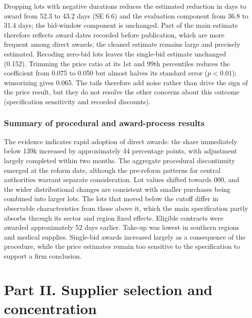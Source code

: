 \documentclass[11pt,a4paper]{article}
\begin{document}
Dropping lots with negative durations reduces the estimated reduction in days to award from 52.3 to 43.2 days (SE 6.6) and the evaluation component from 36.8 to 31.4 days; the bid-window component is unchanged. Part of the main estimate therefore reflects award dates recorded before publication, which are more frequent among direct awards; the cleaned estimate remains large and precisely estimated. Recoding zero-bid lots leaves the single-bid estimate unchanged (0.152). Trimming the price ratio at its 1st and 99th percentiles reduces the coefficient from 0.075 to 0.050 but almost halves its standard error ($p<0.01$); winsorizing gives 0.065. The tails therefore add noise rather than drive the sign of the price result, but they do not resolve the other concerns about this outcome (specification sensitivity and recorded discounts).

\section{Summary of procedural and award-process results}

The evidence indicates rapid adoption of direct awards: the share immediately below \texteuro139k increased by approximately 44 percentage points, with adjustment largely completed within two months. The aggregate procedural discontinuity emerged at the reform date, although the pre-reform patterns for central authorities warrant separate consideration. Lot values shifted towards 000, and the wider distributional changes are consistent with smaller purchases being combined into larger lots. The lots that moved below the cutoff differ in observable characteristics from those above it, which the main specification partly absorbs through its sector and region fixed effects. Eligible contracts were awarded approximately 52 days earlier. Take-up was lowest in southern regions and medical supplies. Single-bid awards increased largely as a consequence of the procedure, while the price estimates remain too sensitive to the specification to support a firm conclusion.

\part*{Part II. Supplier selection and concentration}
\end{document}
